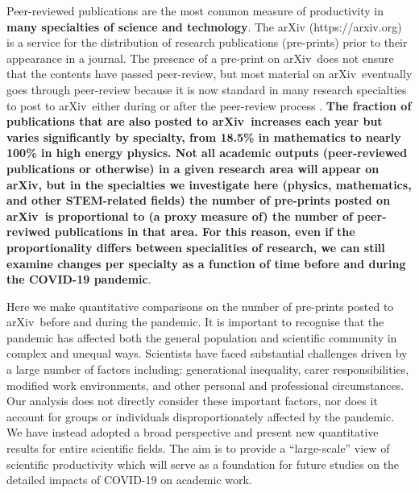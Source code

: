 \documentclass[]{rsos}%
\newcommand{\arxiv}{arXiv}
\newcommand{\change}[1]{\textbf{#1}}
\begin{document}
\maketitle



\noindent Peer-reviewed publications are the most common measure of productivity in \change{many specialties of science and technology}. The \arxiv\cite{Ginsparg:2011} ({https://arxiv.org}) is a service for the distribution of research publications (pre-prints) prior to their appearance in a journal. The presence of a pre-print on \arxiv\ does not ensure that the contents have passed peer-review, but most material on \arxiv\ eventually goes through peer-review because it is now standard in many research specialties to post to \arxiv\ either during or after the peer-review process \cite{Lariviere:2014}. \change{The fraction of publications that are also posted to \arxiv\ increases each year but varies significantly by specialty, from 18.5\% in mathematics to nearly 100\% in high energy physics\cite{?,??}. 
Not all academic outputs (peer-reviewed publications or otherwise) in a given research area will appear on \arxiv, but in the specialties we investigate here (physics, mathematics, and other STEM-related fields) the number of pre-prints posted on \arxiv\ is proportional to (a proxy measure of) the number of peer-reviwed publications in that area. For this reason, even if the proportionality differs between specialities of research, we can still examine changes per specialty as a function of time before and during the COVID-19 pandemic}.


Here we make quantitative comparisons on the number of pre-prints posted to \arxiv\ before and during the pandemic. It is important to recognise that the pandemic has affected both the general population\cite{Nicola:2020,Chu:2020,IbnMohammed:2021} and scientific community\cite{Viglione:2020,Gewen:2020,King:2021} in complex and unequal ways. Scientists have faced substantial challenges driven by a large number of factors including: generational inequality, carer responsibilities, modified work environments, and other personal and professional circumstances. Our analysis does not directly consider these important factors, nor does it account for groups or individuals disproportionately affected by the pandemic. We have instead adopted a broad perspective and present new quantitative results for entire scientific fields. The aim is to provide a “large-scale” view of scientific productivity which will serve as a foundation for future studies on the detailed impacts of COVID-19 on academic work.
\end{document}
